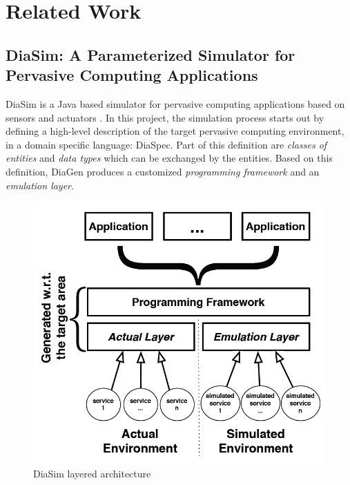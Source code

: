 \chapter{Related Work}\label{ch:related_work}

\section{DiaSim: A Parameterized Simulator for Pervasive Computing Applications}\label{sec:ubiwise}

DiaSim is a Java based simulator for pervasive computing applications based on sensors and actuators \cite{bruneau2009diasim}. In this project, the simulation process starts out by defining a high-level description of the target pervasive computing environment, in a domain specific language: DiaSpec. Part of this definition are \emph{classes of entities} and \emph{data types} which can be exchanged by the entities. Based on this definition, DiaGen produces a customized \emph{programming framework} and an \emph{emulation layer}.\\

\begin{figure}[H]
	\centering
	\includegraphics[width=\linewidth]{gfx/Chapter2/diasim_layered_architecture}
	\caption{DiaSim layered architecture}
	\label{fig:diasim_architecture}
\end{figure}

